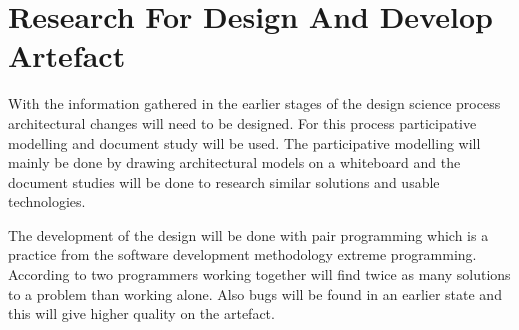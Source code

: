 \section{Research For Design And Develop Artefact}
With the information gathered in the earlier stages of the design science process architectural changes will need to be designed. For this process participative modelling \cite{johannesson2012design} and document study will be used. The participative modelling will mainly be done by drawing architectural models on a whiteboard and the document studies will be done to research similar solutions and usable technologies. 

The development of the design will be done with pair programming \cite{williams2000all} which is a practice from the software development methodology extreme programming. According to  \cite{williams2000all} two programmers working together will find twice as many solutions to a problem than working alone. Also bugs will be found in an earlier state and this will give higher quality on the artefact. 
